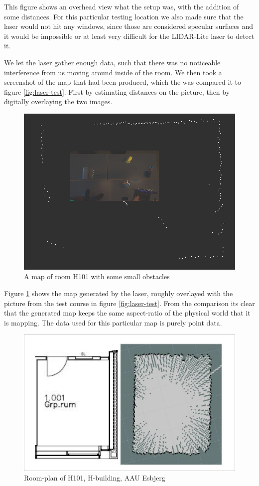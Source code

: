 This figure shows an overhead view what the setup was, with the addition of some distances. For this particular testing location we also made sure that the laser would not hit any windows, since those are considered specular surfaces and it would be impossible or at least very difficult for the LIDAR-Lite laser to detect it.

We let the laser gather enough data, such that there was no noticeable interference from us moving around inside of the room. We then took a screenshot of the map that had been produced, which the was compared it to figure \ref{fig:laser-test}. First by estimating distances on the picture, then by digitally overlaying the two images.

\begin{figure}[H]
	\centering
	\includegraphics[scale=.4]{images/h101_obstacles_overlay.png}
	\caption{A map of room H101 with some small obstacles}
	\label{fig:laser-compare}
\end{figure}
	
Figure \ref{fig:laser-compare} shows the map generated by the laser, roughly overlayed with the picture from the test course in figure \ref{fig:laser-test}. From the comparison its clear that the generated map keeps the same aspect-ratio of the physical world that it is mapping. The data used for this particular map is purely point data.

\begin{figure}[H]
	\centering
	\includegraphics[width=.5\linewidth]{images/compare.jpg}
	\caption{Room-plan of H101, H-building, AAU Esbjerg}
	\label{fig:h101hector}
\end{figure}

